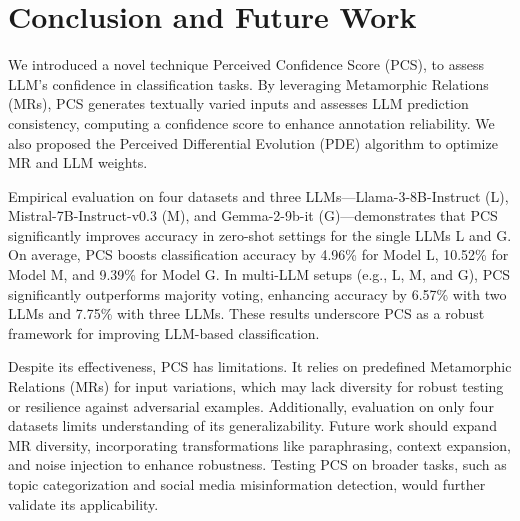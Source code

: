 \section{Conclusion and Future Work}
We introduced a novel technique Perceived Confidence Score (PCS), to assess LLM's confidence in classification tasks. By leveraging Metamorphic Relations (MRs), PCS generates textually varied inputs and assesses LLM prediction consistency, computing a confidence score to enhance annotation reliability. We also proposed the Perceived Differential Evolution (PDE) algorithm to optimize MR and LLM weights. 

Empirical evaluation on four datasets and three LLMs—Llama-3-8B-Instruct (L), Mistral-7B-Instruct-v0.3 (M), and Gemma-2-9b-it (G)—demonstrates that PCS significantly improves accuracy in zero-shot settings for the single LLMs L and G. On average, PCS boosts classification accuracy by 4.96\% for Model L, 10.52\% for Model M, and 9.39\% for Model G. In multi-LLM setups (e.g., L, M, and G), PCS significantly outperforms majority voting, enhancing accuracy by 6.57\% with two LLMs and 7.75\% with three LLMs. These results underscore PCS as a robust framework for improving LLM-based classification.
 

Despite its effectiveness, PCS has limitations. It relies on predefined Metamorphic Relations (MRs) for input variations, which may lack diversity for robust testing or resilience against adversarial examples. Additionally, evaluation on only four datasets limits understanding of its generalizability. Future work should expand MR diversity, incorporating transformations like paraphrasing, context expansion, and noise injection to enhance robustness. Testing PCS on broader tasks, such as topic categorization and social media misinformation detection, would further validate its applicability.

